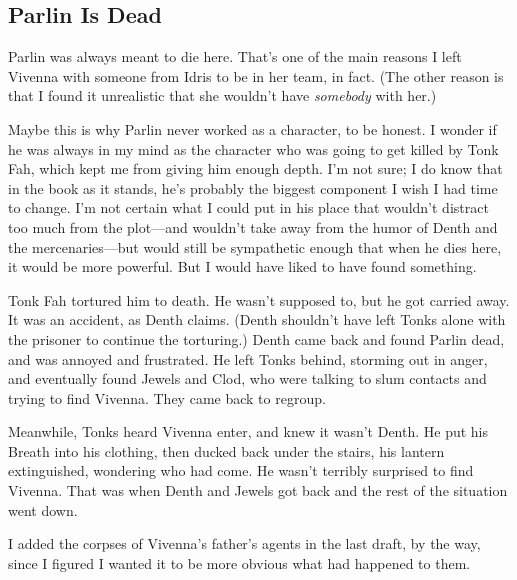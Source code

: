\subsection*{Parlin Is Dead}

Parlin was always meant to die here. That’s one of the main reasons I left Vivenna with someone from Idris to be in her team, in fact. (The other reason is that I found it unrealistic that she wouldn’t have \textit{somebody} with her.)

Maybe this is why Parlin never worked as a character, to be honest. I wonder if he was always in my mind as the character who was going to get killed by Tonk Fah, which kept me from giving him enough depth. I’m not sure; I do know that in the book as it stands, he’s probably the biggest component I wish I had time to change. I’m not certain what I could put in his place that wouldn’t distract too much from the plot—and wouldn’t take away from the humor of Denth and the mercenaries—but would still be sympathetic enough that when he dies here, it would be more powerful. But I would have liked to have found something.

Tonk Fah tortured him to death. He wasn’t supposed to, but he got carried away. It was an accident, as Denth claims. (Denth shouldn’t have left Tonks alone with the prisoner to continue the torturing.) Denth came back and found Parlin dead, and was annoyed and frustrated. He left Tonks behind, storming out in anger, and eventually found Jewels and Clod, who were talking to slum contacts and trying to find Vivenna. They came back to regroup.

Meanwhile, Tonks heard Vivenna enter, and knew it wasn’t Denth. He put his Breath into his clothing, then ducked back under the stairs, his lantern extinguished, wondering who had come. He wasn’t terribly surprised to find Vivenna. That was when Denth and Jewels got back and the rest of the situation went down.

I added the corpses of Vivenna’s father’s agents in the last draft, by the way, since I figured I wanted it to be more obvious what had happened to them.



